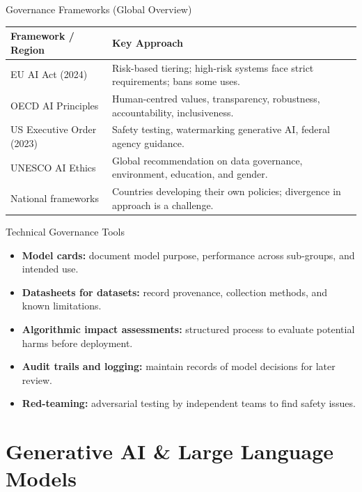 \documentclass[10pt]{beamer}
\begin{document}
\begin{frame}{Governance Frameworks (Global Overview)}
    \small
    \setlength{\tabcolsep}{6pt}
    \renewcommand{\arraystretch}{1.25}
    \begin{tabularx}{\textwidth}{l X}
        \toprule
        \textbf{Framework / Region} & \textbf{Key Approach} \\
        \midrule
        EU AI Act (2024)     & Risk-based tiering; high-risk systems face strict requirements; bans some uses. \\
        OECD AI Principles   & Human-centred values, transparency, robustness, accountability, inclusiveness. \\
        US Executive Order (2023) & Safety testing, watermarking generative AI, federal agency guidance. \\
        UNESCO AI Ethics     & Global recommendation on data governance, environment, education, and gender. \\
        National frameworks  & Countries developing their own policies; divergence in approach is a challenge. \\
        \bottomrule
    \end{tabularx}
\end{frame}

\begin{frame}{Technical Governance Tools}
    \begin{itemize}
        \item \textbf{Model cards:} document model purpose, performance across sub-groups, and intended use.
        \item \textbf{Datasheets for datasets:} record provenance, collection methods, and known limitations.
        \item \textbf{Algorithmic impact assessments:} structured process to evaluate potential harms before deployment.
        \item \textbf{Audit trails and logging:} maintain records of model decisions for later review.
        \item \textbf{Red-teaming:} adversarial testing by independent teams to find safety issues.
    \end{itemize}
\end{frame}

\section{Generative AI \& Large Language Models}
\end{document}
